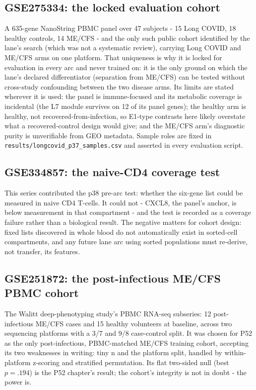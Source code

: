 \documentclass[11pt,a4paper]{article}
\begin{document}
\subsection{GSE275334: the locked evaluation cohort}
A 635-gene NanoString PBMC panel over 47 subjects - 15 Long COVID, 18 healthy
controls, 14 ME/CFS - and the only such public cohort identified by the
lane's search (which was not a systematic review),
carrying Long COVID and ME/CFS arms on one platform. That uniqueness is why
it is locked for evaluation in every arc and never trained on: it is the only
ground on which the lane's declared differentiator (separation from ME/CFS)
can be tested without cross-study confounding between the two disease arms.
Its limits are stated wherever it is used: the panel is immune-focused and
its metabolic coverage is incidental (the L7 module survives on 12 of its
panel genes); the healthy arm is healthy, not recovered-from-infection, so
E1-type contrasts here likely overstate what a recovered-control design
would give; and the ME/CFS arm's diagnostic purity is unverifiable from GEO
metadata. Sample roles are fixed in
\texttt{results/longcovid\_p37\_samples.csv} and asserted in every evaluation
script.

\subsection{GSE334857: the naive-CD4 coverage test}
This series contributed the p38 pre-arc test: whether the six-gene list could
be measured in naive CD4 T-cells. It could not - CXCL8, the panel's anchor,
is below measurement in that compartment - and the test is recorded as a
coverage failure rather than a biological result. The negative matters for
cohort design: fixed lists discovered in whole blood do not automatically
exist in sorted-cell compartments, and any future lane arc using sorted
populations must re-derive, not transfer, its features.

\subsection{GSE251872: the post-infectious ME/CFS PBMC cohort}
The Walitt deep-phenotyping study's PBMC RNA-seq subseries: 12 post-infectious
ME/CFS cases and 15 healthy volunteers at baseline, across two sequencing
platforms with a 3/7 and 9/8 case-control split. It was chosen for P52 as the
only post-infectious, PBMC-matched ME/CFS training cohort, accepting its two
weaknesses in writing: tiny n and the platform split, handled by
within-platform z-scoring and stratified permutation. Its flat two-sided null
(best $p=.194$) is the P52 chapter's result; the cohort's integrity is not in
doubt - the power is.
\end{document}
